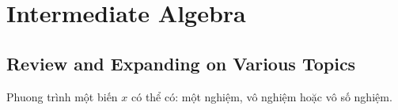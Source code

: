 \chapter{Intermediate Algebra}

\section{Review and Expanding on Various Topics}

Phuong trình một biến $x$ có thể có: một nghiệm, vô nghiệm hoặc vô số nghiệm.

